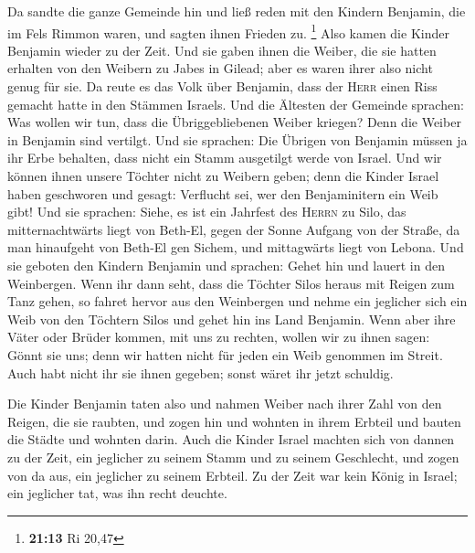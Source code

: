  Da sandte die ganze Gemeinde hin und ließ reden mit den
Kindern Benjamin, die im Fels Rimmon waren, und sagten ihnen Frieden zu.
\footnote{\textbf{21:13} Ri 20,47}  Also kamen die Kinder
Benjamin wieder zu der Zeit. Und sie gaben ihnen die Weiber, die sie
hatten erhalten von den Weibern zu Jabes in Gilead; aber es waren ihrer
also nicht genug für sie.  Da reute es das Volk über
Benjamin, dass der \textsc{Herr} einen Riss gemacht hatte in den Stämmen
Israels.  Und die Ältesten der Gemeinde sprachen: Was
wollen wir tun, dass die Übriggebliebenen Weiber kriegen? Denn die
Weiber in Benjamin sind vertilgt.  Und sie sprachen: Die
Übrigen von Benjamin müssen ja ihr Erbe behalten, dass nicht ein Stamm
ausgetilgt werde von Israel.  Und wir können ihnen unsere
Töchter nicht zu Weibern geben; denn die Kinder Israel haben geschworen
und gesagt: Verflucht sei, wer den Benjaminitern ein Weib gibt!
 Und sie sprachen: Siehe, es ist ein Jahrfest des
\textsc{Herrn} zu Silo, das mitternachtwärts liegt von Beth-El, gegen
der Sonne Aufgang von der Straße, da man hinaufgeht von Beth-El gen
Sichem, und mittagwärts liegt von Lebona.  Und sie
geboten den Kindern Benjamin und sprachen: Gehet hin und lauert in den
Weinbergen.  Wenn ihr dann seht, dass die Töchter Silos
heraus mit Reigen zum Tanz gehen, so fahret hervor aus den Weinbergen
und nehme ein jeglicher sich ein Weib von den Töchtern Silos und gehet
hin ins Land Benjamin.  Wenn aber ihre Väter oder Brüder
kommen, mit uns zu rechten, wollen wir zu ihnen sagen: Gönnt sie uns;
denn wir hatten nicht für jeden ein Weib genommen im Streit. Auch habt
nicht ihr sie ihnen gegeben; sonst wäret ihr jetzt schuldig.

 Die Kinder Benjamin taten also und nahmen Weiber nach
ihrer Zahl von den Reigen, die sie raubten, und zogen hin und wohnten in
ihrem Erbteil und bauten die Städte und wohnten darin. 
Auch die Kinder Israel machten sich von dannen zu der Zeit, ein
jeglicher zu seinem Stamm und zu seinem Geschlecht, und zogen von da
aus, ein jeglicher zu seinem Erbteil.  Zu der Zeit war
kein König in Israel; ein jeglicher tat, was ihn recht deuchte.
